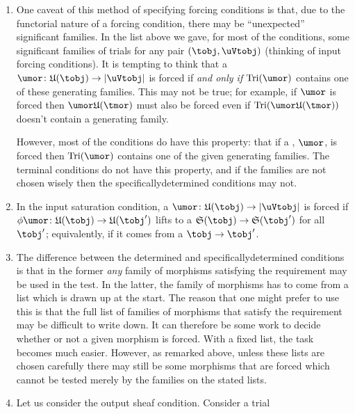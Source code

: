 \documentclass[%
a4paper,%
arxiv,%
defaults
]{myclass}
\begin{document}
\begin{remark}
\begin{enumerate}
\item 
One caveat of this method of specifying forcing conditions is that, due to the functorial nature of a forcing condition, there may be ``unexpected'' significant families.
In the list above we gave, for most of the conditions, some significant families of trials for any pair \((\tobj, \uVtobj)\) (thinking of input forcing conditions).
It is tempting to think that a \umor \(\umor \colon \ufunc(\tobj) \to \forfunc[\uVtobj]\) is forced if \emph{and only if} \(\trials{\umor}\) contains one of these generating families.
This may not be true; for example, if \(\umor\) is forced then \(\umor \ufunc(\tmor)\) must also be forced even if \(\trials{\umor \ufunc(\tmor)}\) doesn't contain a generating family.

However, most of the conditions do have this property: that if a \umor, \(\umor\), is forced then \(\trials{\umor}\) contains one of the given generating families.
The terminal conditions do not have this property, and if the families are not chosen wisely then the specifically\enhyp{}determined conditions may not.

\item 
In the input saturation condition, a \umor \(\umor \colon \ufunc(\tobj) \to \forfunc[\uVtobj]\) is forced if \(\ofn \umor \colon \ufunc(\tobj) \to \ufunc(\tobj')\) lifts to a \uVtmor \(\sfunc(\tobj) \to \sfunc(\tobj')\) for all \(\tobj'\); equivalently, if it comes from a \tmor \(\tobj \to \tobj'\).

\item
The difference between the determined and specifically\enhyp{}determined conditions is that in the former \emph{any} family of morphisms satisfying the requirement may be used in the test.
In the latter, the family of morphisms has to come from a list which is drawn up at the start.
The reason that one might prefer to use this is that the full list of families of morphisms that satisfy the requirement may be difficult to write down.
It can therefore be some work to decide whether or not a given morphism is forced.
With a fixed list, the task becomes much easier.
However, as remarked above, unless these lists are chosen carefully there may still be some morphisms that are forced which cannot be tested merely by the families on the stated lists.

\item Let us consider the output sheaf condition.
Consider a trial


\end{enumerate}
\end{remark}
\end{document}
